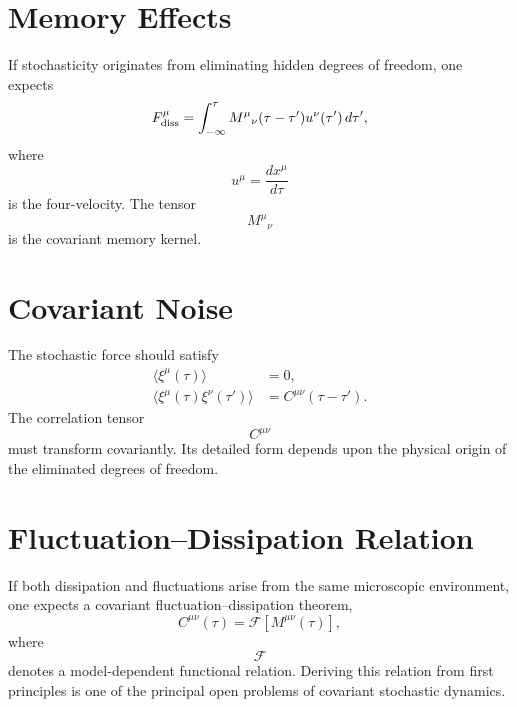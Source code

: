 \section{Memory Effects}
If stochasticity originates from eliminating hidden degrees of freedom,
one expects
\begin{equation}
F^\mu_{\rm diss}=\int_{-\infty}^{\tau}
    M^{\mu}{}_{\nu}(\tau-\tau')u^\nu(\tau')\,d\tau',
\end{equation}
where
\[u^\mu=\frac{dx^\mu}{d\tau}\]
is the four-velocity.
The tensor
\[M^{\mu}{}_{\nu}\]
is the covariant memory kernel.
\section{Covariant Noise}
The stochastic force should satisfy
\begin{align}
\langle\xi^\mu(\tau)\rangle&=0,\\
\langle\xi^\mu(\tau)\xi^\nu(\tau')\rangle&=C^{\mu\nu}(\tau-\tau').
\end{align}
The correlation tensor
\[C^{\mu\nu}\]
must transform covariantly.
Its detailed form depends upon the physical origin of the eliminated
degrees of freedom.
\section{Fluctuation--Dissipation Relation}
If both dissipation and fluctuations arise from the same microscopic
environment,
one expects a covariant fluctuation--dissipation theorem,
\begin{equation}
C^{\mu\nu}(\tau)=\mathcal{F}\!\left[M^{\mu\nu}(\tau)\right],
\end{equation}
where
\[\mathcal{F}\]
denotes a model-dependent functional relation.
Deriving this relation from first principles is one of the principal
open problems of covariant stochastic dynamics.
